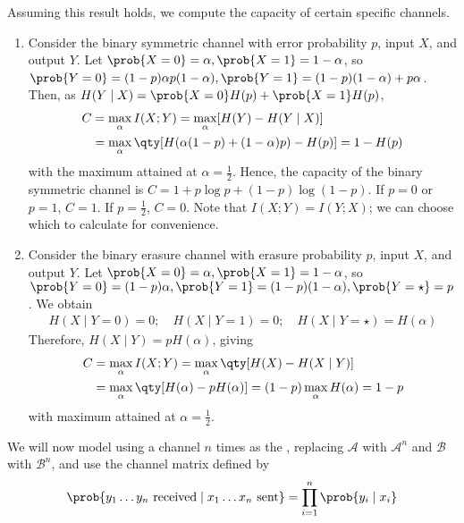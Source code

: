 \begin{example}
    Assuming this result holds, we compute the capacity of certain specific channels.
    \begin{enumerate}
        \item Consider the binary symmetric channel with error probability $p$, input $X$, and output $Y$.
        Let $\prob{X = 0} = \alpha, \prob{X = 1} = 1 - \alpha$, so $\prob{Y = 0} = (1-p)\alpha p(1-\alpha), \prob{Y = 1} = (1-p)(1-\alpha) + p\alpha$.
        Then, as $H(Y \mid X) = \prob{X=0} H(p) + \prob{X = 1} H(p)$,
        \begin{align*}
            C &= \max_\alpha I(X;Y) = \max_\alpha [H(Y) - H(Y\mid X)] \\
            &= \max_\alpha \qty[H(\alpha(1-p) + (1-\alpha)p) - H(p)] = 1 - H(p)
       \end{align*}
        with the maximum attained at $\alpha = \frac{1}{2}$.
        Hence, the capacity of the binary symmetric channel is $C = 1 + p \log p + (1-p) \log (1-p)$.
        If $p = 0$ or $p = 1$, $C = 1$.
        If $p = \frac{1}{2}$, $C = 0$.
        Note that $I(X;Y) = I(Y;X)$; we can choose which to calculate for convenience.
        \item Consider the binary erasure channel with erasure probability $p$, input $X$, and output $Y$.
        Let $\prob{X = 0} = \alpha, \prob{X = 1} = 1 - \alpha$, so $\prob{Y = 0} = (1-p)\alpha, \prob{Y = 1} = (1-p)(1-\alpha), \prob{Y = \star} = p$.
        We obtain
        \begin{align*}
        H(X \mid Y = 0) = 0;\quad H(X \mid Y = 1) = 0;\quad H(X \mid Y = \star) = H(\alpha)
    \end{align*}
        Therefore, $H(X \mid Y) = pH(\alpha)$, giving
        \begin{align*}
            C &= \max_\alpha I(X;Y) = \max_\alpha \qty[H(X) - H(X \mid Y)] \\
            &= \max_\alpha \qty[H(\alpha) - pH(\alpha)] = (1-p) \max_\alpha H(\alpha) = 1-p
       \end{align*}
        with maximum attained at $\alpha = \frac{1}{2}$.
    \end{enumerate}
\end{example}
We will now model using a channel $n$ times as the , replacing $\mathcal A$ with $\mathcal A^n$ and $\mathcal B$ with $\mathcal B^n$, and use the channel matrix defined by
\begin{align*}
        \prob{y_1 \dots y_n \text{ received} \mid x_1 \dots x_n \text{ sent}} = \prod_{i=1}^n \prob{y_i \mid x_i}
    \end{align*}
